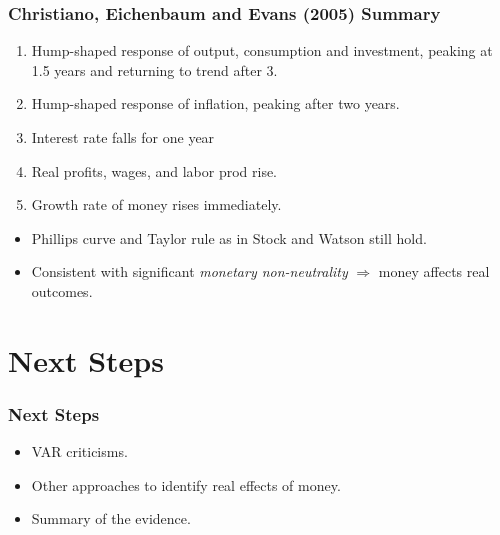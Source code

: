 \documentclass[english,xcolor=svgnames]{beamer}
\begin{document}
\begin{frame}
\frametitle{Christiano, Eichenbaum and Evans (2005) Summary}
\begin{enumerate}[1.]
	\item Hump-shaped response of output, consumption and investment, peaking at 1.5 years and returning to trend after 3.
	\item Hump-shaped response of inflation, peaking after two years.
	\item  Interest rate falls for one year
	\item Real profits, wages, and labor prod rise.
	\item Growth rate of money rises immediately.
\end{enumerate}
\begin{itemize}
		\item Phillips curve and Taylor rule as in Stock and Watson still hold.
		\item Consistent with significant \emph{monetary non-neutrality} $\Rightarrow$ money affects real outcomes.
	\end{itemize}
\end{frame}


\section{Next Steps}


\begin{frame}
\frametitle{Next Steps
}
\begin{itemize}
	\item VAR criticisms.
	\item Other approaches to identify real effects of money.
	\item Summary of the evidence.
\end{itemize}
\end{frame}
\end{document}
